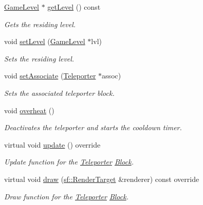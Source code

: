 \begin{DoxyCompactItemize}
\mbox{\label{class_teleporter_ad2b34f80f5e09028a38bc80452930667}} 
\mbox{\hyperlink{class_game_level}{Game\+Level}} $\ast$ \mbox{\hyperlink{class_teleporter_ad2b34f80f5e09028a38bc80452930667}{get\+Level}} () const
\begin{DoxyCompactList}\small\item\em Gets the residing level. \end{DoxyCompactList}\item 
\mbox{\label{class_teleporter_a6f5d756a3808110eefc833a1f3b86aa5}} 
void \mbox{\hyperlink{class_teleporter_a6f5d756a3808110eefc833a1f3b86aa5}{set\+Level}} (\mbox{\hyperlink{class_game_level}{Game\+Level}} $\ast$lvl)
\begin{DoxyCompactList}\small\item\em Sets the residing level. \end{DoxyCompactList}\item 
\mbox{\label{class_teleporter_aa7ac3050bb31687cf296bf24ca3721b4}} 
void \mbox{\hyperlink{class_teleporter_aa7ac3050bb31687cf296bf24ca3721b4}{set\+Associate}} (\mbox{\hyperlink{class_teleporter}{Teleporter}} $\ast$assoc)
\begin{DoxyCompactList}\small\item\em Sets the associated teleporter block. \end{DoxyCompactList}\item 
\mbox{\label{class_teleporter_a38e1ea0cfa49fbddf61e789587affb19}} 
void \mbox{\hyperlink{class_teleporter_a38e1ea0cfa49fbddf61e789587affb19}{overheat}} ()
\begin{DoxyCompactList}\small\item\em Deactivates the teleporter and starts the cooldown timer. \end{DoxyCompactList}\item 
\mbox{\label{class_teleporter_aaaf2de7cb31c11a616cb27ea8f2eb73b}} 
virtual void \mbox{\hyperlink{class_teleporter_aaaf2de7cb31c11a616cb27ea8f2eb73b}{update}} () override
\begin{DoxyCompactList}\small\item\em Update function for the \mbox{\hyperlink{class_teleporter}{Teleporter}} \mbox{\hyperlink{class_block}{Block}}. \end{DoxyCompactList}\item 
virtual void \mbox{\hyperlink{class_teleporter_a621bb8c380bf14910c18753ed7c25750}{draw}} (\mbox{\hyperlink{classsf_1_1_render_target}{sf\+::\+Render\+Target}} \&renderer) const override
\begin{DoxyCompactList}\small\item\em Draw function for the \mbox{\hyperlink{class_teleporter}{Teleporter}} \mbox{\hyperlink{class_block}{Block}}. \end{DoxyCompactList}\end{DoxyCompactItemize}
